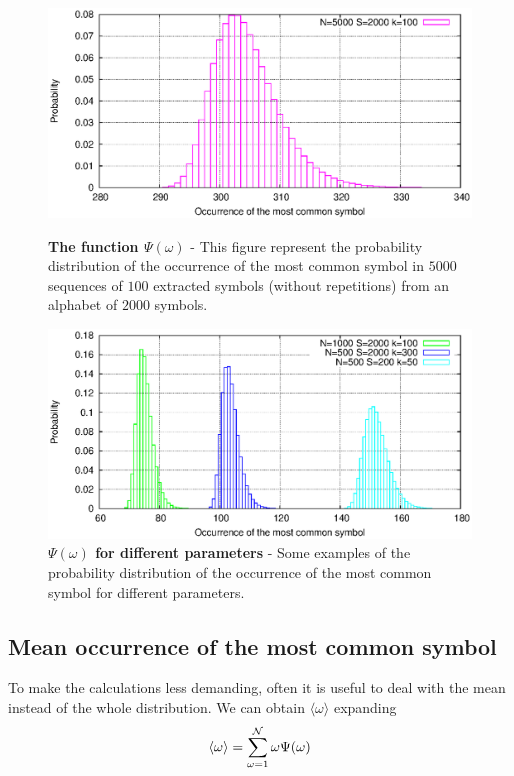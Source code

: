 \begin{figure}[p]%
\center
\includegraphics[width=\textwidth,draft=false]{grafici/campana1.eps}
\caption{\label{Tpsi1} \footnotesize\textbf{The function $\Psi (\omega)$ } - This figure represent the probability distribution of the occurrence of the most common symbol in $5000$ sequences of $100$ extracted symbols (without repetitions) from an alphabet of $2000$ symbols.}
\vspace{1cm}
\includegraphics[width=\textwidth,draft=false]{grafici/campana2.eps}
\caption{\label{Tpsi2} \footnotesize\textbf{$\Psi (\omega)$ for different parameters} - Some examples of the probability distribution of the occurrence of the most common symbol for different parameters.}
\end{figure}

\subsection{Mean occurrence of the most common symbol}
To make the calculations less demanding, often it is useful to deal with the mean instead of the whole distribution. We can obtain $\langle \omega \rangle$ expanding
\[ \langle \omega \rangle = \sum_{\omega = 1}^{\mathcal N} \omega \Psi(\omega) \]

